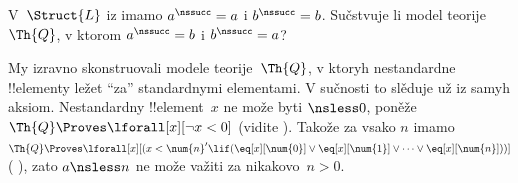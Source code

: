 \documentclass[../../../include/open-logic-section]{subfiles}
\begin{document}
\begin{prob}
V~$\Struct{L}$ iz 
 imamo $a^\nssucc
= a$ i $b^\nssucc = b$. Sučstvuje li model teorije~$\Th{Q}$, v ktorom
$a^\nssucc = b$ i $b^\nssucc = a$?
\end{prob}

\begin{explain}
My izravno skonstruovali modele teorije~$\Th{Q}$, v ktoryh
nestandardne !!{element}y ležet ``za'' standardnymi elementami. V
sučnosti to slěduje už iz samyh aksiom. Nestandardny !!{element}~$x$
ne može byti ${} \nsless 0$, poněže $\Th{Q} \Proves
\lforall[x][\lnot x<0]$ (vidite 
). Takože za vsako $n$ imamo
$\Th{Q} \Proves \lforall[x][(x < \num{n}' \lif
(\eq[x][\num{0}] \lor \eq[x][\num{1}] \lor \dots \lor
\eq[x][\num{n}]))]$ (
), zato $a \nsless n$ ne može
važiti za nikakovo~$n>0$.
\end{explain}
\end{document}
